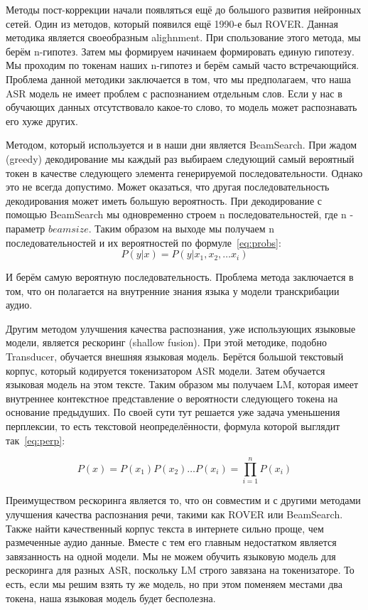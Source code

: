 Методы пост-коррекции начали появляться ещё до большого развития нейронных сетей.
Один из методов, который появился ещё 1990-е был ROVER.
Данная методика является своеобразным alighnment.
При спользование этого метода, мы берём n-гипотез. 
Затем мы формируем начинаем формировать единую гипотезу.
Мы проходим по токенам наших n-гипотез и берём самый часто встречающийся.
Проблема данной методики заключается в том, что мы предполагаем, что наша ASR модель не имеет проблем с распознанием отдельным слов.
Если у нас в обучающих данных отсутствовало какое-то слово, то модель может распознавать его хуже других.

Методом, который используется и в наши дни является BeamSearch.
При жадом (greedy) декодирование мы каждый раз выбираем следующий самый вероятный токен в качестве следующего элемента генерируемой последовательности.
Однако это не всегда допустимо.
Может оказаться, что другая последовательность декодирования может иметь большую вероятность.
При декодирование с помощью BeamSearch мы одновременно строем n последовательностей, где n - параметр $beam size$.
Таким образом на выходе мы получаем n последовательностей и их вероятностей по формуле~\ref{eq:probs}:
\begin{equation}
  P(y|x) = P(y|x_1,x_2,\dots x_i)
  \label{eq:probs}
\end{equation}

И берём самую вероятную последовательность.
Проблема метода заключается в том, что он полагается на внутренние знания языка у модели транскрибации аудио.

Другим методом улучшения качества распознания, уже использующих языковые модели, является рескоринг (shallow fusion).
При этой методике, подобно Transducer, обучается внешняя языковая модель.
Берётся большой текстовый корпус, который кодируется токенизатором ASR модели.
Затем обучается языковая модель на этом тексте.
Таким образом мы получаем LM, которая имеет внутреннее контекстное представление о вероятности следующего токена на основание предыдуших.
По своей сути тут решается уже задача уменьшения перплексии, то есть текстовой неопределённости, формула которой выглядит так~\ref{eq:perp}:

\begin{equation}
  P(x) = P(x_1)P(x_2)\dots P(x_i) = \prod_{i=1}^{n}P(x_i)
  \label{eq:perp}
\end{equation}

Преимуществом рескоринга является то, что он совместим и с другими методами улучшения качества распознания речи, такими как ROVER или BeamSearch.
Также найти качественный корпус текста в интернете сильно проще, чем размеченные аудио данные.
Вместе с тем его главным недостатком является завязанность на одной модели.
Мы не можем обучить языковую модель для рескоринга для разных ASR, поскольку LM строго завязана на токенизаторе.
То есть, если мы решим взять ту же модель, но при этом поменяем местами два токена, наша языковая модель будет бесполезна.

